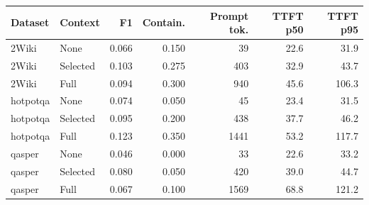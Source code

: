\begin{tabular}{llrrrrr}
\toprule
Dataset & Context & F1 & Contain. & Prompt tok. & TTFT p50 & TTFT p95 \\
\midrule
2Wiki & None & 0.066 & 0.150 & 39 & 22.6 & 31.9 \\
2Wiki & Selected & 0.103 & 0.275 & 403 & 32.9 & 43.7 \\
2Wiki & Full & 0.094 & 0.300 & 940 & 45.6 & 106.3 \\
hotpotqa & None & 0.074 & 0.050 & 45 & 23.4 & 31.5 \\
hotpotqa & Selected & 0.095 & 0.200 & 438 & 37.7 & 46.2 \\
hotpotqa & Full & 0.123 & 0.350 & 1441 & 53.2 & 117.7 \\
qasper & None & 0.046 & 0.000 & 33 & 22.6 & 33.2 \\
qasper & Selected & 0.080 & 0.050 & 420 & 39.0 & 44.7 \\
qasper & Full & 0.067 & 0.100 & 1569 & 68.8 & 121.2 \\
\bottomrule
\end{tabular}
